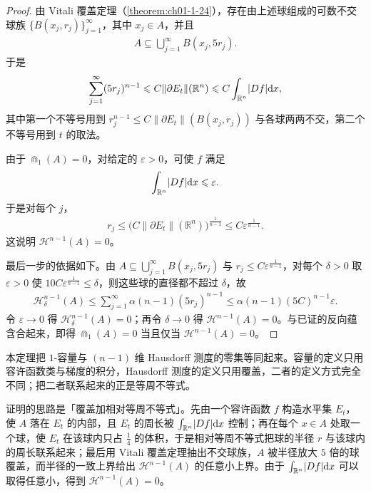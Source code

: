 ﻿\documentclass[../../main.tex]{subfiles}%
\begin{document}
\begin{proof}
由 Vitali 覆盖定理（\cref{theorem:ch01-1-24}），存在由上述球组成的可数不交球族 $\{B(x_j,r_j)\}_{j=1}^{\infty}$，其中 $x_j\in A$，并且%
\begin{align*}
A\subseteq\bigcup_{j=1}^{\infty}B(x_j,5r_j).
\end{align*}
于是
\begin{align*}
\sum_{j=1}^{\infty}(5r_j)^{n-1}\leqslant C\lVert\partial E_t\rVert(\mathbb{R}^n)\leqslant C\int_{\mathbb{R}^n}\lvert Df\rvert\mathrm{d} x,
\end{align*}
其中第一个不等号用到 $r_j^{n-1}\leqslant C\lVert\partial E_t\rVert(B(x_j,r_j))$ 与各球两两不交，第二个不等号用到 $t$ 的取法。

由于 $\Cap_1(A)=0$，对给定的 $\varepsilon>0$，可使 $f$ 满足
\begin{align*}
\int_{\mathbb{R}^n}\lvert Df\rvert\mathrm{d} x\leqslant\varepsilon .
\end{align*}
于是对每个 $j$，
\begin{align*}
r_j\leqslant\bigl(C\lVert\partial E_t\rVert(\mathbb{R}^n)\bigr)^{\frac{1}{n-1}}\leqslant C\varepsilon^{\frac{1}{n-1}} .
\end{align*}
这说明 $\mathcal{H}^{n-1}(A)=0$。

最后一步的依据如下。由 $A\subseteq\bigcup_{j=1}^{\infty}B(x_j,5r_j)$ 与 $r_j\leqslant C\varepsilon^{\frac{1}{n-1}}$，对每个 $\delta>0$ 取 $\varepsilon>0$ 使 $10C\varepsilon^{\frac{1}{n-1}}\leqslant\delta$，则这些球的直径都不超过 $\delta$，故
\begin{align*}
\mathcal{H}^{n-1}_\delta(A)\leqslant\sum_{j=1}^{\infty}\alpha(n-1)(5r_j)^{n-1}\leqslant\alpha(n-1)(5C)^{n-1}\varepsilon .
\end{align*}
令 $\varepsilon\to0$ 得 $\mathcal{H}^{n-1}_\delta(A)=0$；再令 $\delta\to0$ 得 $\mathcal{H}^{n-1}(A)=0$。与已证的反向蕴含合起来，即得 $\Cap_1(A)=0$ 当且仅当 $\mathcal{H}^{n-1}(A)=0$。
\end{proof}

\begin{remark}\label{remark:ch05-thm-5-12-动机}
本定理把 $1$-容量与 $(n-1)$ 维 Hausdorff 测度的零集等同起来。容量的定义只用容许函数类与梯度的积分，Hausdorff 测度的定义只用覆盖，二者的定义方式完全不同；把二者联系起来的正是等周不等式。

证明的思路是「覆盖加相对等周不等式」。先由一个容许函数 $f$ 构造水平集 $E_t$，使 $A$ 落在 $E_t$ 的内部，且 $E_t$ 的周长被 $\int_{\mathbb{R}^n}\lvert Df\rvert\mathrm{d} x$ 控制；再在每个 $x\in A$ 处取一个球，使 $E_t$ 在该球内只占 $\frac14$ 的体积，于是相对等周不等式把球的半径 $r$ 与该球内的周长联系起来；最后用 Vitali 覆盖定理抽出不交球族，$A$ 被半径放大 $5$ 倍的球覆盖，而半径的一致上界给出 $\mathcal{H}^{n-1}(A)$ 的任意小上界。由于 $\int_{\mathbb{R}^n}\lvert Df\rvert\mathrm{d} x$ 可以取得任意小，得到 $\mathcal{H}^{n-1}(A)=0$。
\end{remark}
\end{document}
